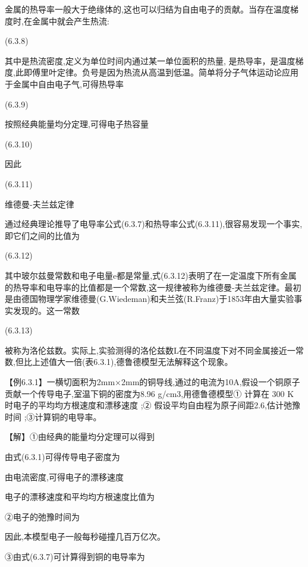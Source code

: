 金属的热导率一般大于绝缘体的,这也可以归结为自由电子的贡献。当存在温度梯度时,在金属中就会产生热流:

 	(6.3.8)

其中是热流密度,定义为单位时间内通过某一单位面积的热量, 是热导率，是温度梯度,此即傅里叶定律。负号是因为热流从高温到低温。简单将分子气体运动论应用于金属中自由电子气,可得热导率

	(6.3.9)

按照经典能量均分定理,可得电子热容量

 	(6.3.10)

因此

 	(6.3.11)





维德曼-夫兰兹定律

通过经典理论推导了电导率公式(6.3.7)和热导率公式(6.3.11),很容易发现一个事实,即它们之间的比值为

 	(6.3.12)

其中玻尔兹曼常数和电子电量e都是常量,式(6.3.12)表明了在一定温度下所有金属的热导率和电导率的比值都是一个常数,这一规律被称为维德曼-夫兰兹定律。最初是由德国物理学家维德曼(G.Wiedeman)和夫兰弦(R.Franz)于1853年由大量实验事实发现的。这一常数

	(6.3.13)

被称为洛伦兹数。实际上,实验测得的洛伦兹数L在不同温度下对不同金属接近一常数,但比上述值大一倍(表6.3.1),德鲁德模型无法解释这个现象。





【例6.3.1】一横切面积为2mm×2mm的铜导线,通过的电流为10A,假设一个铜原子贡献一个传导电子,室温下铜的密度为8.96 g/cm3,用德鲁德模型① 计算在 300 K 时电子的平均均方根速度和漂移速度 ;② 假设平均自由程为原子间距2.6,估计弛豫时间 ;③计算铜的电导率。

【解】①由经典的能量均分定理可以得到



由式(6.3.1)可得传导电子密度为



由电流密度,可得电子的漂移速度



电子的漂移速度和平均均方根速度比值为



②电子的弛豫时间为



因此,本模型电子一般每秒碰撞几百万亿次。

③由式(6.3.7)可计算得到铜的电导率为



